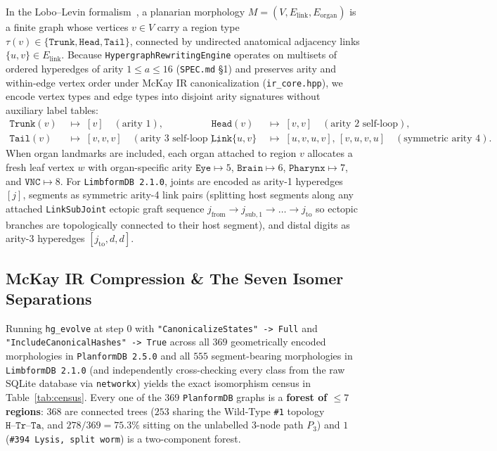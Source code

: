 \documentclass[11pt,a4paper]{article}
\theoremstyle{definition}
\theoremstyle{remark}
\begin{document}
In the Lobo--Levin formalism~\cite{Lobo2013BiologyOpen,Lobo2014Regeneration}, a planarian morphology $M = (V, E_{\text{link}}, E_{\text{organ}})$ is a finite graph whose vertices $v \in V$ carry a region type $\tau(v) \in \{\mathtt{Trunk}, \mathtt{Head}, \mathtt{Tail}\}$, connected by undirected anatomical adjacency links $\{u, v\} \in E_{\text{link}}$. Because \texttt{HypergraphRewritingEngine} operates on multisets of ordered hyperedges of arity $1 \le a \le 16$ (\texttt{SPEC.md} \S1) and preserves arity and within-edge vertex order under McKay IR canonicalization (\texttt{ir\_core.hpp}), we encode vertex types and edge types into disjoint arity signatures without auxiliary label tables:
\begin{equation}
  \begin{aligned}
    \mathtt{Trunk}(v) &\;\mapsto\; [v] \quad (\text{arity } 1), &
    \mathtt{Head}(v) &\;\mapsto\; [v, v] \quad (\text{arity } 2 \text{ self-loop}), \\
    \mathtt{Tail}(v) &\;\mapsto\; [v, v, v] \quad (\text{arity } 3 \text{ self-loop}), &
    \mathtt{Link}\{u, v\} &\;\mapsto\; [u, v, u, v],\, [v, u, v, u] \quad (\text{symmetric arity } 4).
  \end{aligned}
  \label{eq:encoding}
\end{equation}
When organ landmarks are included, each organ attached to region $v$ allocates a fresh leaf vertex $w$ with organ-specific arity $\mathtt{Eye} \mapsto 5$, $\mathtt{Brain} \mapsto 6$, $\mathtt{Pharynx} \mapsto 7$, and $\mathtt{VNC} \mapsto 8$. For \texttt{LimbformDB~2.1.0}, joints are encoded as arity-1 hyperedges $[j]$, segments as symmetric arity-4 link pairs (splitting host segments along any attached \texttt{LinkSubJoint} ectopic graft sequence $j_{\text{from}} \to j_{\text{sub},1} \to \dots \to j_{\text{to}}$ so ectopic branches are topologically connected to their host segment), and distal digits as arity-3 hyperedges $[j_{\text{to}}, d, d]$.

\subsection{McKay IR Compression \& The Seven Isomer Separations}

Running \texttt{hg\_evolve} at step $0$ with \texttt{"CanonicalizeStates" -> Full} and \texttt{"IncludeCanonicalHashes" -> True} across all $369$ geometrically encoded morphologies in \texttt{PlanformDB~2.5.0} and all $555$ segment-bearing morphologies in \texttt{LimbformDB~2.1.0} (and independently cross-checking every class from the raw SQLite database via \texttt{networkx}) yields the exact isomorphism census in Table~\ref{tab:census}. Every one of the $369$ \texttt{PlanformDB} graphs is a \textbf{forest of $\le 7$ regions}: $368$ are connected trees ($253$ sharing the Wild-Type \texttt{\#1} topology $\mathtt{H\text{--}Tr\text{--}Ta}$, and $278/369 = 75.3\%$ sitting on the unlabelled 3-node path $P_3$) and $1$ (\texttt{\#394 Lysis, split worm}) is a two-component forest.
\end{document}
